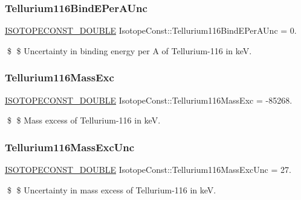 \subsubsection{\texorpdfstring{Tellurium116\+Bind\+E\+Per\+A\+Unc}{Tellurium116BindEPerAUnc}}
{\footnotesize\ttfamily \mbox{\hyperlink{group___isotope_const-_macros_ga8f45a7272ce02c0b4c65c44636ed719a}{I\+S\+O\+T\+O\+P\+E\+C\+O\+N\+S\+T\+\_\+\+D\+O\+U\+B\+LE}} Isotope\+Const\+::\+Tellurium116\+Bind\+E\+Per\+A\+Unc = 0.}

\$ \$ Uncertainty in binding energy per A of Tellurium-\/116 in keV. \mbox{\label{group___isotope_const-_tellurium-_te116_ga1284ed787d589dfc4f09f54e37a7a4ff}} 
\subsubsection{\texorpdfstring{Tellurium116\+Mass\+Exc}{Tellurium116MassExc}}
{\footnotesize\ttfamily \mbox{\hyperlink{group___isotope_const-_macros_ga8f45a7272ce02c0b4c65c44636ed719a}{I\+S\+O\+T\+O\+P\+E\+C\+O\+N\+S\+T\+\_\+\+D\+O\+U\+B\+LE}} Isotope\+Const\+::\+Tellurium116\+Mass\+Exc = -\/85268.}

\$ \$ Mass excess of Tellurium-\/116 in keV. \mbox{\label{group___isotope_const-_tellurium-_te116_gaf45245203890a6ff6c1caf778d35d384}} 
\subsubsection{\texorpdfstring{Tellurium116\+Mass\+Exc\+Unc}{Tellurium116MassExcUnc}}
{\footnotesize\ttfamily \mbox{\hyperlink{group___isotope_const-_macros_ga8f45a7272ce02c0b4c65c44636ed719a}{I\+S\+O\+T\+O\+P\+E\+C\+O\+N\+S\+T\+\_\+\+D\+O\+U\+B\+LE}} Isotope\+Const\+::\+Tellurium116\+Mass\+Exc\+Unc = 27.}

\$ \$ Uncertainty in mass excess of Tellurium-\/116 in keV. \mbox{\label{group___isotope_const-_tellurium-_te116_ga51ccecc2f5f1ee21e468ae2bade18408}} 
